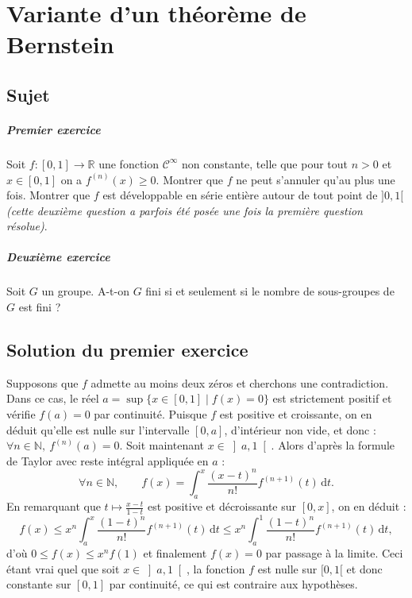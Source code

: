 \chapter{Variante d'un théorème de Bernstein}

\section{Sujet}

\paragraph{Premier exercice}
Soit $f : [0, 1] \rightarrow  \mathbb{R}$ une fonction $\mathcal{C}^{\infty }$ non constante, telle que pour tout $n > 0$ et $x \in [0, 1]$ on a $f^{(n)}(x) \geqslant  0$. Montrer que $f$ ne peut s'annuler qu'au plus une fois. Montrer que $f$ est développable en série entière autour de tout point de $]0, 1[$ \emph{(cette deuxième question a parfois été posée une fois la première question résolue)}.

\paragraph{Deuxième exercice}
Soit $G$ un groupe. A-t-on $G$ fini si et seulement si le nombre de sous-groupes de $G$ est fini ?

\section{Solution du premier exercice} %

Supposons que $f$ admette au moins deux zéros et cherchons une contradiction. Dans ce cas, le réel $a = \sup \{x\in  [0,1] \mid f(x) = 0 \}$ est strictement positif et vérifie $f(a) = 0$ par continuité. Puisque $f$ est positive et croissante, on en déduit qu'elle est nulle sur l'intervalle $[0,a]$, d'intérieur non vide, et donc : $\forall n\in \mathbb{N},\  f^{(n)} (a) = 0$. Soit maintenant $x \in \left]a,1\right[$. Alors d'après la formule de Taylor avec reste intégral appliquée en $a$ :
\[
\forall  n\in \mathbb{N},\qquad
f(x) = \int_a^x \frac{(x-t)^n}{n!} f^{(n+1)}(t) \,\mathrm dt.
\]
En remarquant que $t\mapsto\frac{x-t}{1-t}$ est positive et décroissante sur  $[0,x]$, on en déduit :
\[
f(x) \leqslant x^n \int _{a} ^{x} \frac{(1-t)^{n} }{n!} f^{(n+1)}(t) \,\mathrm{d}t
\leqslant 
x^n \int _{a} ^{1} \frac{(1-t)^{n} }{n!} f^{(n+1)}(t) \,\mathrm{d}t,
\]
d'où $0 \leqslant f(x) \leqslant x^n f(1)$ et finalement $f(x) = 0$ par passage à la limite. Ceci étant vrai quel que soit $x \in \left]a,1\right[$, la fonction $f$ est nulle sur $[0,1[$ et donc constante sur $[0,1]$ par continuité, ce qui est contraire aux hypothèses.\\

